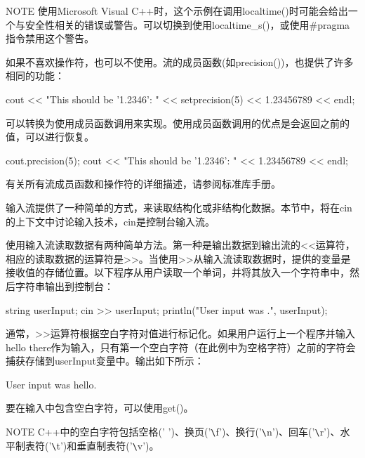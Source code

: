 \begin{myNotic}{NOTE}
使用Microsoft Visual C++时，这个示例在调用localtime()时可能会给出一个与安全性相关的错误或警告。可以切换到使用localtime\_s()，或使用\#pragma指令禁用这个警告。
\end{myNotic}

如果不喜欢操作符，也可以不使用。流的成员函数(如precision())，也提供了许多相同的功能：

\begin{cpp}
cout << "This should be '1.2346': " << setprecision(5) << 1.23456789 << endl;
\end{cpp}

可以转换为使用成员函数调用来实现。使用成员函数调用的优点是会返回之前的值，可以进行恢复。

\begin{cpp}
cout.precision(5);
cout << "This should be '1.2346': " << 1.23456789 << endl;
\end{cpp}

有关所有流成员函数和操作符的详细描述，请参阅标准库手册。


输入流提供了一种简单的方式，来读取结构化或非结构化数据。本节中，将在cin的上下文中讨论输入技术，cin是控制台输入流。


使用输入流读取数据有两种简单方法。第一种是输出数据到输出流的<{}<运算符，相应的读取数据的运算符是>{}>。当使用>{}>从输入流读取数据时，提供的变量是接收值的存储位置。以下程序从用户读取一个单词，并将其放入一个字符串中，然后字符串输出到控制台：

\begin{cpp}
string userInput;
cin >> userInput;
println("User input was {}.", userInput);
\end{cpp}

通常，>{}>运算符根据空白字符对值进行标记化。如果用户运行上一个程序并输入hello there作为输入，只有第一个空白字符（在此例中为空格字符）之前的字符会捕获存储到userInput变量中。输出如下所示：

\begin{shell}
User input was hello.
\end{shell}

要在输入中包含空白字符，可以使用get()。

\begin{myNotic}{NOTE}
C++中的空白字符包括空格(' ')、换页('\verb|\|f')、换行('\verb|\|n')、回车('\verb|\|r')、水平制表符('\verb|\|t')和垂直制表符('\verb|\|v')。
\end{myNotic}

